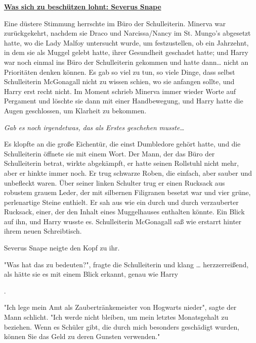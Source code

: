 

\hypertarget{was-sich-zu-beschuxfctzen-lohnt-severus-snape}{%

\textbf{\uline{Was sich zu beschützen lohnt: Severus Snape}}

Eine düstere Stimmung herrschte im Büro der Schulleiterin. Minerva war zurückgekehrt, nachdem sie Draco und Narcissa/Nancy im St. Mungo's abgesetzt hatte, wo die Lady Malfoy untersucht wurde, um festzustellen, ob ein Jahrzehnt, in dem sie als Muggel gelebt hatte, ihrer Gesundheit geschadet hatte; und Harry war noch einmal ins Büro der Schulleiterin gekommen und hatte dann… nicht an Prioritäten denken können. Es gab so viel zu tun, so viele Dinge, dass selbst Schulleiterin McGonagall nicht zu wissen schien, wo sie anfangen sollte, und Harry erst recht nicht. Im Moment schrieb Minerva immer wieder Worte auf Pergament und löschte sie dann mit einer Handbewegung, und Harry hatte die Augen geschlossen, um Klarheit zu bekommen.

\emph{\hfill\break Gab es noch irgendetwas, das als Erstes geschehen musste…}

Es klopfte an die große Eichentür, die einst Dumbledore gehört hatte, und die Schulleiterin öffnete sie mit einem Wort. Der Mann, der das Büro der Schulleiterin betrat, wirkte abgekämpft, er hatte seinen Rollstuhl nicht mehr, aber er hinkte immer noch. Er trug schwarze Roben, die einfach, aber sauber und unbefleckt waren. Über seiner linken Schulter trug er einen Rucksack aus robustem grauem Leder, der mit silbernen Filigranen besetzt war und vier grüne, perlenartige Steine enthielt. Er sah aus wie ein durch und durch verzauberter Rucksack, einer, der den Inhalt eines Muggelhauses enthalten könnte. Ein Blick auf ihn, und Harry wusste es. Schulleiterin McGonagall saß wie erstarrt hinter ihrem neuen Schreibtisch.

Severus Snape neigte den Kopf zu ihr.

"Was hat das zu bedeuten?", fragte die Schulleiterin und klang … herzzerreißend, als hätte sie es mit einem Blick erkannt, genau wie Harry

.

"Ich lege mein Amt als Zaubertränkemeister von Hogwarts nieder", sagte der Mann schlicht. "Ich werde nicht bleiben, um mein letztes Monatsgehalt zu beziehen. Wenn es Schüler gibt, die durch mich besonders geschädigt wurden, können Sie das Geld zu deren Gunsten verwenden."

}
